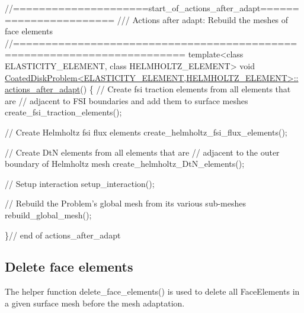  
\begin{DoxyCodeInclude}
\textcolor{comment}{//=====================start\_of\_actions\_after\_adapt=======================}
\textcolor{comment}{///  Actions after adapt: Rebuild the meshes of face elements}
\textcolor{comment}{}\textcolor{comment}{//========================================================================}
\textcolor{keyword}{template}<\textcolor{keyword}{class} ELASTICITY\_ELEMENT, \textcolor{keyword}{class} HELMHOLTZ\_ELEMENT>
\textcolor{keywordtype}{void} \hyperlink{classCoatedDiskProblem_a93f9d34cd24f08ca1ec726ae0057b939}{CoatedDiskProblem<ELASTICITY\_ELEMENT,HELMHOLTZ\_ELEMENT>::}
\hyperlink{classCoatedDiskProblem_a93f9d34cd24f08ca1ec726ae0057b939}{actions\_after\_adapt}()
\{
 \textcolor{comment}{// Create fsi traction elements from all elements that are }
 \textcolor{comment}{// adjacent to FSI boundaries and add them to surface meshes}
 create\_fsi\_traction\_elements();
 
 \textcolor{comment}{// Create Helmholtz fsi flux elements}
 create\_helmholtz\_fsi\_flux\_elements();
 
 \textcolor{comment}{// Create DtN elements from all elements that are }
 \textcolor{comment}{// adjacent to the outer boundary of Helmholtz mesh}
 create\_helmholtz\_DtN\_elements();
 
 \textcolor{comment}{// Setup interaction}
 setup\_interaction();
 
 \textcolor{comment}{// Rebuild the Problem's global mesh from its various sub-meshes}
 rebuild\_global\_mesh();
 
\}\textcolor{comment}{// end of actions\_after\_adapt}

\end{DoxyCodeInclude}




 

\hypertarget{index_delete}{}\subsection{Delete face elements}\label{index_delete}
The helper function {\ttfamily delete\+\_\+face\+\_\+elements()} is used to delete all {\ttfamily Face\+Elements} in a given surface mesh before the mesh adaptation.

